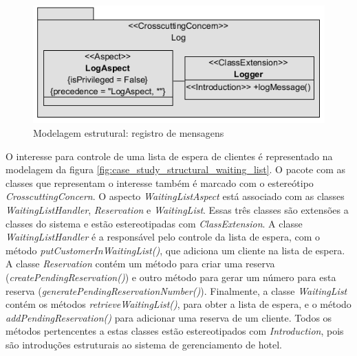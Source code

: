  \begin{figure}[!h]
	\centering
	\includegraphics{img/case_study_structural_log.png}
	\caption{Modelagem estrutural: registro de mensagens}\label{fig:case_study_structural_log}
  \end{figure}
  
O interesse para controle de uma lista de espera de clientes é representado na modelagem da figura \ref{fig:case_study_structural_waiting_list}. O
pacote com as classes que representam o interesse também é marcado com o estereótipo \textit{CrosscuttingConcern}. O aspecto \textit{WaitingListAspect} está
associado com as classes \textit{WaitingListHandler}, \textit{Reservation} e \textit{WaitingList}. Essas três classes são extensões a classes do
sistema e estão estereotipadas com \textit{ClassExtension}. A classe \textit{WaitingListHandler} é a responsável pelo controle da lista de espera, com
o método \textit{putCustomerInWaitingList()}, que adiciona um cliente na lista de espera. A classe \textit{Reservation} contém um método para criar
uma reserva (\textit{createPendingReservation()}) e outro método para gerar um número para esta reserva (\textit{generatePendingReservationNumber()}).
Finalmente, a classe \textit{WaitingList} contém os métodos \textit{retrieveWaitingList()}, para obter a lista de espera, e o método
\textit{addPendingReservation()} para adicionar uma reserva de um cliente. Todos os métodos pertencentes a estas classes estão estereotipados com
\textit{Introduction}, pois são introduções estruturais ao sistema de gerenciamento de hotel.

